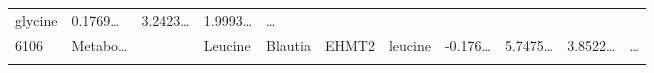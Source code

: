 \documentclass[
]{article}
\begin{document}
\begin{longtable}[]{@{}lllllllllll@{}}
\begin{minipage}[t]{0.09\columnwidth}
glycine\strut
\end{minipage} & \begin{minipage}[t]{0.07\columnwidth}\raggedright
0.1769\ldots{}\strut
\end{minipage} & \begin{minipage}[t]{0.07\columnwidth}\raggedright
3.2423\ldots{}\strut
\end{minipage} & \begin{minipage}[t]{0.07\columnwidth}\raggedright
1.9993\ldots{}\strut
\end{minipage} & \begin{minipage}[t]{0.03\columnwidth}\raggedright
\ldots{}\strut
\end{minipage}\tabularnewline
\begin{minipage}[t]{0.05\columnwidth}\raggedright
6106\strut
\end{minipage} & \begin{minipage}[t]{0.07\columnwidth}\raggedright
Metabo\ldots{}\strut
\end{minipage} & \begin{minipage}[t]{0.07\columnwidth}\raggedright
\strut
\end{minipage} & \begin{minipage}[t]{0.09\columnwidth}\raggedright
Leucine\strut
\end{minipage} & \begin{minipage}[t]{0.07\columnwidth}\raggedright
Blautia\strut
\end{minipage} & \begin{minipage}[t]{0.07\columnwidth}\raggedright
EHMT2\strut
\end{minipage} & \begin{minipage}[t]{0.09\columnwidth}\raggedright
leucine\strut
\end{minipage} & \begin{minipage}[t]{0.07\columnwidth}\raggedright
-0.176\ldots{}\strut
\end{minipage} & \begin{minipage}[t]{0.07\columnwidth}\raggedright
5.7475\ldots{}\strut
\end{minipage} & \begin{minipage}[t]{0.07\columnwidth}\raggedright
3.8522\ldots{}\strut
\end{minipage} & \begin{minipage}[t]{0.03\columnwidth}\raggedright
\ldots{}\strut
\end{minipage}\tabularnewline
\begin{minipage}[t]{0.05\columnwidth}\raggedright

\end{minipage}
\end{longtable}
\end{document}
